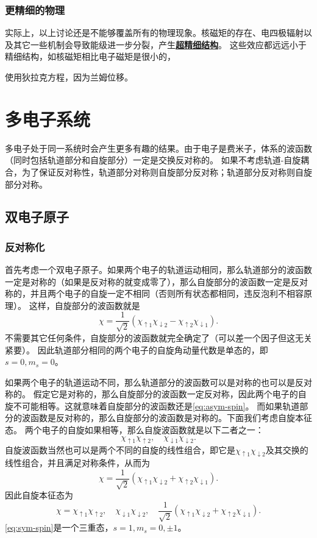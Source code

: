 \documentclass[UTF8, a4paper]{ctexart}
\newcommand*{\concept}[1]{\underline{\textbf{#1}}}
\begin{document}
\subsubsection{更精细的物理}


实际上，以上讨论还是不能够覆盖所有的物理现象。核磁矩的存在、电四极辐射以及其它一些机制会导致能级进一步分裂，产生\concept{超精细结构}。
这些效应都远远小于精细结构，如核磁矩相比电子磁矩是很小的，

使用狄拉克方程，因为兰姆位移。

\section{多电子系统}

多电子处于同一系统时会产生更多有趣的结果。由于电子是费米子，体系的波函数（同时包括轨道部分和自旋部分）一定是交换反对称的。
如果不考虑轨道-自旋耦合，为了保证反对称性，轨道部分对称则自旋部分反对称；轨道部分反对称则自旋部分对称。

\subsection{双电子原子}

\subsubsection{反对称化}

首先考虑一个双电子原子。如果两个电子的轨道运动相同，那么轨道部分的波函数一定是对称的（如果是反对称的就变成零了），那么自旋部分的波函数一定是反对称的，并且两个电子的自旋一定不相同（否则所有状态都相同，违反泡利不相容原理）。
这样，自旋部分的波函数就是
\begin{equation}
    \chi = \frac{1}{\sqrt{2}} (\chi_{\uparrow 1} \chi_{\downarrow 2} - \chi_{\uparrow 2} \chi_{\downarrow 1}).
    \label{eq:asym-spin}
\end{equation}
不需要其它任何条件，自旋部分的波函数就完全确定了（可以差一个因子但这无关紧要）。
因此轨道部分相同的两个电子的自旋角动量代数是单态的，即$s=0, m_s=0$。

如果两个电子的轨道运动不同，那么轨道部分的波函数可以是对称的也可以是反对称的。
假定它是对称的，那么自旋部分的波函数一定反对称，因此两个电子的自旋不可能相等。这就意味着自旋部分的波函数还是\eqref{eq:asym-spin}。
而如果轨道部分的波函数是反对称的，那么自旋部分的波函数是对称的。下面我们考虑自旋本征态。
两个电子的自旋如果相等，那么自旋波函数就是以下二者之一：
\[
    \chi_{\uparrow 1} \chi_{\uparrow 2}, \quad \chi_{\downarrow 1} \chi_{\downarrow 2}.
\]
自旋波函数当然也可以是两个不同的自旋的线性组合，即它是$\chi_{\uparrow 1} \chi_{\downarrow 2}$及其交换的线性组合，并且满足对称条件，从而为
\[
    \chi = \frac{1}{\sqrt{2}} (\chi_{\uparrow 1} \chi_{\downarrow 2} + \chi_{\uparrow 2} \chi_{\downarrow 1}).
\]
因此自旋本征态为
\begin{equation}
    \chi = \chi_{\uparrow 1} \chi_{\uparrow 2}, \quad \chi_{\downarrow 1} \chi_{\downarrow 2}, \quad \frac{1}{\sqrt{2}} (\chi_{\uparrow 1} \chi_{\downarrow 2} + \chi_{\uparrow 2} \chi_{\downarrow 1}).
    \label{eq:sym-spin}
\end{equation}
\eqref{eq:sym-spin}是一个三重态，$s=1, m_s=0, \pm 1$。
\end{document}
